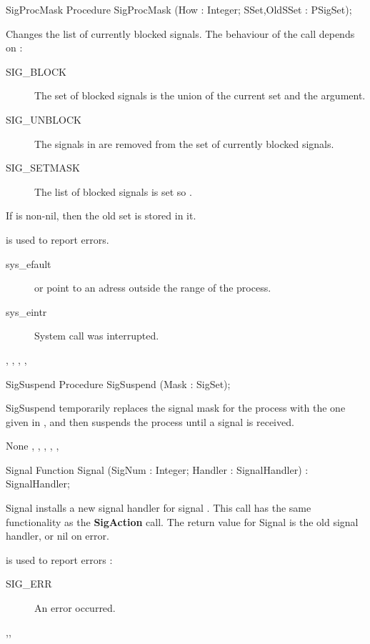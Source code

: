 \begin{procedure}{SigProcMask}
\Declaration
Procedure SigProcMask (How : Integer; SSet,OldSSet : PSigSet);

\Description

Changes the list of currently blocked signals. The behaviour of the call
depends on  :
\begin{description}
\item[SIG\_BLOCK] The set of blocked signals is the union of the current set
and the  argument.
\item[SIG\_UNBLOCK] The signals in  are removed from the set of
currently blocked signals.
\item[SIG\_SETMASK] The list of blocked signals is set so .
\end{description}
If  is non-nil, then the old set is stored in it.

\Errors
{} is used to report errors.
\begin{description}
\item[sys\_efault]  or  point to an adress outside
the range of the process.
\item[sys\_eintr] System call was interrupted.
\end{description}

\SeeAlso
{}, , , ,
\end{procedure}
\begin{procedure}{SigSuspend}
\Declaration
Procedure SigSuspend (Mask : SigSet);

\Description
SigSuspend temporarily replaces the signal mask for the process with the one
given in , and then suspends the process until a signal is received.

\Errors
None
\SeeAlso
{}, , , ,
,  
\end{procedure}
\begin{function}{Signal}
\Declaration
Function Signal (SigNum : Integer; Handler : SignalHandler) : SignalHandler;

\Description

Signal installs a new signal handler for signal . This call has
the same functionality as the \textbf{SigAction} call.
The return value for Signal is the old signal handler, or nil on error.

\Errors
{} is used to report errors :
\begin{description}
\item[SIG\_ERR] An error occurred.
\end{description}

\SeeAlso
{},,  
\end{function}
